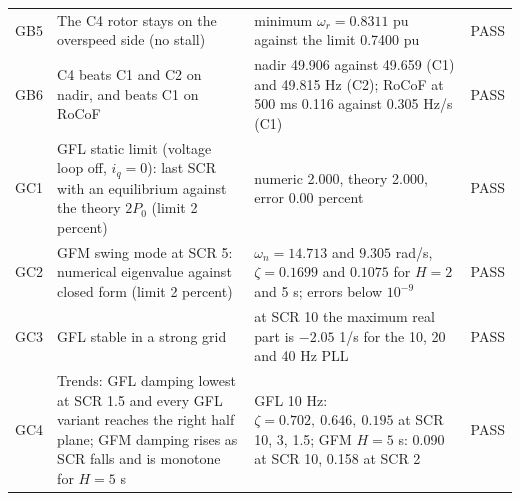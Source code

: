 \begin{table}[H]
\begin{tabular}{@{}l>{\raggedright\arraybackslash}p{5.3cm}>{\raggedright\arraybackslash}p{8.3cm}c@{}}
GB5 & The C4 rotor stays on the overspeed side (no stall) & minimum $\omega_r=0.8311$ pu against the limit 0.7400 pu & PASS\\
GB6 & C4 beats C1 and C2 on nadir, and beats C1 on RoCoF & nadir 49.906 against 49.659 (C1) and 49.815 Hz (C2); RoCoF at 500 ms 0.116 against 0.305 Hz/s (C1) & PASS\\\midrule
GC1 & GFL static limit (voltage loop off, $i_q=0$): last SCR with an equilibrium against the theory $2P_0$ (limit 2 percent) & numeric 2.000, theory 2.000, error 0.00 percent & PASS\\
GC2 & GFM swing mode at SCR 5: numerical eigenvalue against closed form (limit 2 percent) & $\omega_n=14.713$ and $9.305$ rad/s, $\zeta=0.1699$ and $0.1075$ for $H=2$ and 5 s; errors below $10^{-9}$ & PASS\\
GC3 & GFL stable in a strong grid & at SCR 10 the maximum real part is $-2.05$ 1/s for the 10, 20 and 40 Hz PLL & PASS\\
GC4 & Trends: GFL damping lowest at SCR 1.5 and every GFL variant reaches the right half plane; GFM damping rises as SCR falls and is monotone for $H=5$ s & GFL 10 Hz: $\zeta=0.702,\ 0.646,\ 0.195$ at SCR 10, 3, 1.5; GFM $H=5$ s: 0.090 at SCR 10, 0.158 at SCR 2 & PASS\\\bottomrule
\end{tabular}\end{table}
